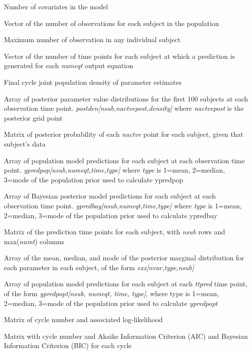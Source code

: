 \documentclass[a4paper]{book}
\begin{document}
\begin{Value}
\begin{ldescription}
\item[\code{ncov }] Number of covariates in the model
\item[\code{nobs }] Vector of the number of observations for each subject in the population
\item[\code{nobsmax }] Maximum number of observation in any individual subject
\item[\code{numt }] Vector of the number of time points for each subject at which a prediction is generated for each \emph{numeqt} output equation
\item[\code{corden }] Final cycle joint population density of parameter estimates
\item[\code{postden }] Array of posterior parameter value distributions for the first 100  subjects at each observation time point.
\emph{postden[nsub,nactvepost,density]} where \emph{nactvepost} is the posterior grid point
\item[\code{pyjgx }] Matrix of posterior probability of each \emph{nactve} point for each subject, given that subject's data
\item[\code{ypredpop }] Array of population model predictions for each subject at each observation time point.
\emph{ypredpop[nsub,numeqt,time,type]} where \emph{type} is 1=mean, 2=median, 3=mode of the population prior used to calculate ypredpop
\item[\code{ypredbay }] Array of Bayesian posterior model predictions for each subject at each observation time point.
\emph{ypredbay[nsub,numeqt,time,type]} where \emph{type} is 1=mean, 2=median, 3=mode of the population prior used to calculate ypredbay
\item[\code{ttpred }] Matrix of the prediction time points for each subject, with \emph{nsub} rows and max(\emph{numt}) columns
\item[\code{exx }] Array of the mean, median, and mode of the posterior marginal distribution for each parameter in each subject, of the form \emph{exx[nvar,type,nsub]}
\item[\code{ypredpopt }] Array of population model predictions for each subject at each
\emph{ttpred} time point,  of the form \emph{ypredpopt[nsub,  numeqt,  time,  type]},
where type is 1=mean,  2=median,  3=mode of the population prior used to calculate
\emph{ypredpopt}
\item[\code{ilog }] Matrix of cycle number and associated log-likelihood
\item[\code{iic }] Matrix with cycle number and Akaike Information Criterion (AIC) and Bayesian Information Criterion (BIC) for each cycle

\end{ldescription}
\end{Value}
\end{document}
